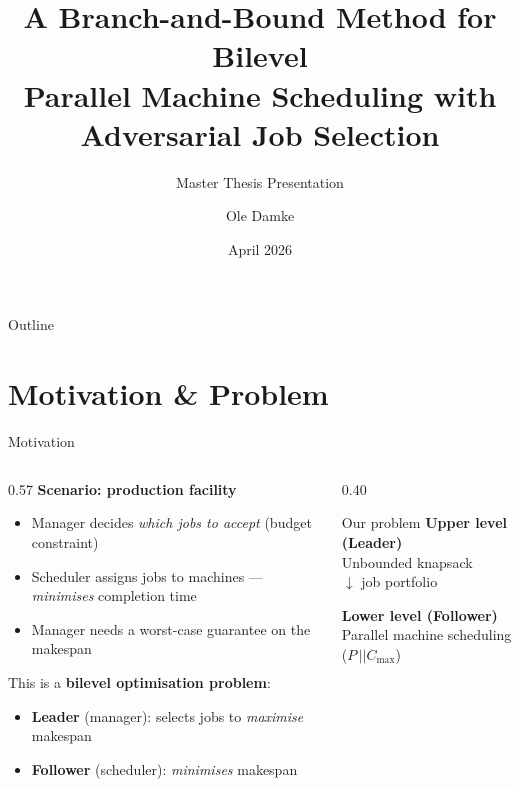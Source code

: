 \documentclass[fleqn,11pt,aspectratio=43]{beamer}
\title[B\&B for Bilevel Parallel Machine Scheduling]{%
  A Branch-and-Bound Method for Bilevel\\
  Parallel Machine Scheduling with\\
  Adversarial Job Selection}
\subtitle{Master Thesis Presentation}
\author{Ole Damke}
\institute{Institut für Mathematische Optimierung\\
  Technische Universität Braunschweig}
\date{April 2026}
\newcommand{\Cmax}{C_{\max}}
\begin{document}

\begin{frame}[plain]
  \titlepage
\end{frame}

\begin{frame}{Outline}
  \tableofcontents
\end{frame}

\section{Motivation \& Problem}

\begin{frame}[shrink=5]{Motivation}
  \begin{columns}[T]
    \begin{column}{0.57\textwidth}
      \textbf{Scenario: production facility}
      \begin{itemize}
        \item Manager decides \emph{which jobs to accept} (budget constraint)
        \item Scheduler assigns jobs to machines — \emph{minimises} completion time
        \item Manager needs a worst-case guarantee on the makespan
      \end{itemize}
      This is a \textbf{bilevel optimisation problem}:
      \begin{itemize}
        \item \textbf{Leader} (manager): selects jobs to \emph{maximise} makespan
        \item \textbf{Follower} (scheduler): \emph{minimises} makespan
      \end{itemize}
    \end{column}
    \begin{column}{0.40\textwidth}
      \begin{block}{Our problem}
        \textbf{Upper level (Leader)}\\
        Unbounded knapsack\\[0.25em]
        \centering$\downarrow$ job portfolio\\[0.25em]
        \raggedright\textbf{Lower level (Follower)}\\
        Parallel machine scheduling\\
        ($P\,||\Cmax$)
      \end{block}
    \end{column}
  \end{columns}
\end{frame}
\end{document}
